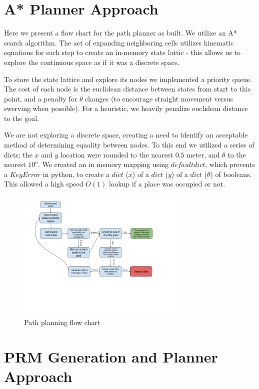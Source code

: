 \documentclass{article}
\begin{document}
\section*{A* Planner Approach}
Here we present a flow chart for the path planner as built. We utilize an A* search algorithm. The act of expanding neighboring cells utilizes kinematic equations for each step to create an in-memory state lattic - this allows us to explore the continuous space as if it was a discrete space.

To store the state lattice and explore its nodes we implemented a priority queue. The cost of each node is the euclidean distance between states from start to this point, and a penalty for $\theta$ changes (to encourage straight movement versus swerving when possible). For a heuristic, we heavily penalize euclidean distance to the goal.

We are not exploring a discrete space, creating a need to identify an acceptable method of determining equality between nodes. To this end we utilized a series of dicts; the $x$ and $y$ location were rounded to the nearest $0.5$ meter, and $\theta$ to the nearest $10^o$. We created an in memory mapping using $defaultdict$, which prevents a $KeyError$ in python, to create a $dict$ ($x$) of a $dict$ ($y$) of a $dict$ ($\theta$) of booleans. This allowed a high speed $O(1)$ lookup if a place was occupied or not.

\begin{figure}[H]
    \centering
    \includegraphics[width = 0.75\textwidth]{imgs/RBE550 Valet flow chart.png}
    \caption{Path planning flow chart}
    \label{fig:path-planning-flowchart}
\end{figure}

\section*{PRM Generation and Planner Approach}
\end{document}
